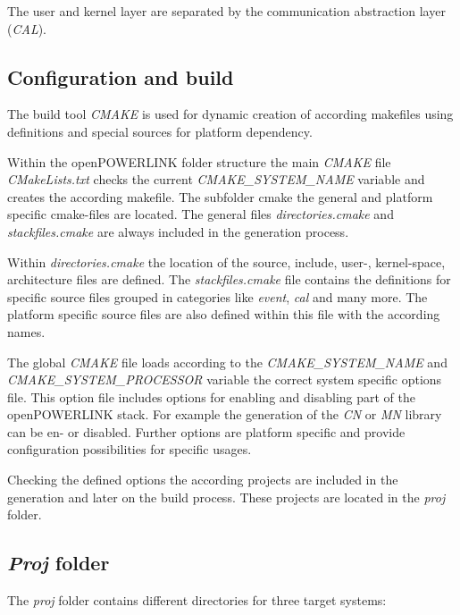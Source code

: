 The user and kernel layer are separated by the communication abstraction layer (\emph{CAL}).


\subsection{Configuration and build}
\label{sec:oplk_structure_build}

The build tool \emph{CMAKE} is used for dynamic creation of according makefiles using definitions and special sources for platform dependency.

Within the openPOWERLINK folder structure the main \emph{CMAKE} file \emph{CMakeLists.txt} checks the current \emph{CMAKE\_SYSTEM\_NAME} variable and creates the according makefile.
The subfolder cmake the general and platform specific cmake-files are located.
The general files \emph{directories.cmake} and \emph{stackfiles.cmake} are always included in the generation process.

Within \emph{directories.cmake} the location of the source, include, user-, kernel-space, architecture files are defined.
The \emph{stackfiles.cmake} file contains the definitions for specific source files grouped in categories like \emph{event}, \emph{cal} and many more.
The platform specific source files are also defined within this file with the according names.

The global \emph{CMAKE} file loads according to the \emph{CMAKE\_SYSTEM\_NAME} and \emph{CMAKE\_SYSTEM\_PROCESSOR} variable the correct system specific options file.
This option file includes options for enabling and disabling part of the openPOWERLINK stack.
For example the generation of the \emph{CN} or \emph{MN} library can be en- or disabled.
Further options are platform specific and provide configuration possibilities for specific usages.

Checking the defined options the according projects are included in the generation and later on the build process.
These projects are located in the \emph{proj} folder.


\subsection{\emph{Proj} folder} %
\label{sec:oplk_structure_proj}
The \emph{proj} folder contains different directories for three target systems:

